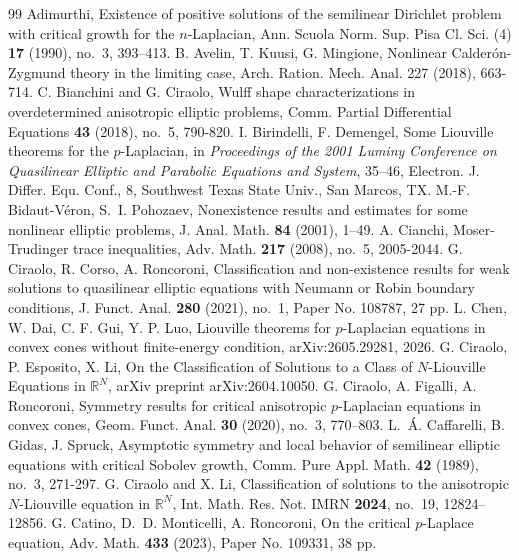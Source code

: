 \documentclass[10pt,a4paper]{amsart}
\numberwithin{equation}{section}
\begin{document}
\begin{thebibliography}{99}
 Adimurthi, Existence of positive solutions of the semilinear Dirichlet problem with critical growth for the $n$-Laplacian, Ann. Scuola Norm. Sup. Pisa Cl. Sci. (4) {\bf 17} (1990), no.~3, 393--413.
 B. Avelin, T. Kuusi, G. Mingione, Nonlinear Calder\'on-Zygmund theory in the limiting case, Arch. Ration. Mech. Anal. 227 (2018), 663-714.
 C. Bianchini and G. Ciraolo, Wulff shape characterizations in overdetermined anisotropic elliptic problems, Comm. Partial Differential Equations {\bf 43} (2018), no.~5, 790-820.
 I. Birindelli, F. Demengel, Some Liouville theorems for the $p$-Laplacian, in {\it Proceedings of the 2001 Luminy Conference on Quasilinear Elliptic and Parabolic Equations and System}, 35--46, Electron. J. Differ. Equ. Conf., 8, Southwest Texas State Univ., San Marcos, TX.
 M.-F. Bidaut-V\'eron, S.~I. Pohozaev, Nonexistence results and estimates for some nonlinear elliptic problems, J. Anal. Math. {\bf 84} (2001), 1--49.
 A. Cianchi, Moser-Trudinger trace inequalities, Adv. Math. {\bf 217} (2008), no.~5, 2005-2044.
 G. Ciraolo, R. Corso, A. Roncoroni, Classification and non-existence results for weak solutions to quasilinear elliptic equations with Neumann or Robin boundary conditions, J. Funct. Anal. {\bf 280} (2021), no.~1, Paper No. 108787, 27 pp.
 L. Chen, W. Dai, C. F. Gui, Y. P. Luo, Liouville theorems for $p$-Laplacian equations in convex cones without finite-energy condition, arXiv:2605.29281, 2026.
 G. Ciraolo, P. Esposito, X. Li, On the Classification of Solutions to a Class of $N$-Liouville Equations in $\mathbb{R}^N$, arXiv preprint arXiv:2604.10050.
 G. Ciraolo, A. Figalli, A. Roncoroni, Symmetry results for critical anisotropic $p$-Laplacian equations in convex cones, Geom. Funct. Anal. {\bf 30} (2020), no.~3, 770--803.
 L.~\'A. Caffarelli, B. Gidas, J. Spruck, Asymptotic symmetry and local behavior of semilinear elliptic equations with critical Sobolev growth, Comm. Pure Appl. Math. {\bf 42} (1989), no.~3, 271-297.
 G. Ciraolo and X. Li, Classification of solutions to the anisotropic $N$-Liouville equation in $\mathbb R^N$, Int. Math. Res. Not. IMRN {\bf 2024}, no.~19, 12824--12856.
 G. Catino, D.~D. Monticelli, A. Roncoroni, On the critical $p$-Laplace equation, Adv. Math. {\bf 433} (2023), Paper No. 109331, 38 pp.

\end{thebibliography}
\end{document}
